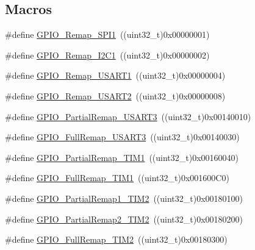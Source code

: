 \subsection*{Macros}
\begin{DoxyCompactItemize}
\item 
\#define \hyperlink{group___g_p_i_o___remap__define_ga58b02a04a6041954c6e99e681716ab4c}{G\+P\+I\+O\+\_\+\+Remap\+\_\+\+S\+P\+I1}~((uint32\+\_\+t)0x00000001)
\item 
\#define \hyperlink{group___g_p_i_o___remap__define_ga6cf601e6db62cb2e9dbbccb276401b18}{G\+P\+I\+O\+\_\+\+Remap\+\_\+\+I2\+C1}~((uint32\+\_\+t)0x00000002)
\item 
\#define \hyperlink{group___g_p_i_o___remap__define_ga804d946c5ca246a1f02f73a086586fd6}{G\+P\+I\+O\+\_\+\+Remap\+\_\+\+U\+S\+A\+R\+T1}~((uint32\+\_\+t)0x00000004)
\item 
\#define \hyperlink{group___g_p_i_o___remap__define_gaeb2ebb12e23138509af20dce1fc6c246}{G\+P\+I\+O\+\_\+\+Remap\+\_\+\+U\+S\+A\+R\+T2}~((uint32\+\_\+t)0x00000008)
\item 
\#define \hyperlink{group___g_p_i_o___remap__define_ga97af4aa8dded530353160cca615ad201}{G\+P\+I\+O\+\_\+\+Partial\+Remap\+\_\+\+U\+S\+A\+R\+T3}~((uint32\+\_\+t)0x00140010)
\item 
\#define \hyperlink{group___g_p_i_o___remap__define_gaa8831190b5b68e9f871955b791fa358b}{G\+P\+I\+O\+\_\+\+Full\+Remap\+\_\+\+U\+S\+A\+R\+T3}~((uint32\+\_\+t)0x00140030)
\item 
\#define \hyperlink{group___g_p_i_o___remap__define_ga0e94344776c53a76f6e9d933139c05a6}{G\+P\+I\+O\+\_\+\+Partial\+Remap\+\_\+\+T\+I\+M1}~((uint32\+\_\+t)0x00160040)
\item 
\#define \hyperlink{group___g_p_i_o___remap__define_gaf1f2d5cbc2281b3e3a6cc51c3fe7f77f}{G\+P\+I\+O\+\_\+\+Full\+Remap\+\_\+\+T\+I\+M1}~((uint32\+\_\+t)0x001600\+C0)
\item 
\#define \hyperlink{group___g_p_i_o___remap__define_ga7ad69d3e2643b2bfee4eebbea4a5b80e}{G\+P\+I\+O\+\_\+\+Partial\+Remap1\+\_\+\+T\+I\+M2}~((uint32\+\_\+t)0x00180100)
\item 
\#define \hyperlink{group___g_p_i_o___remap__define_ga42908e73dfc201d0a7b4ab0ed6f15eb7}{G\+P\+I\+O\+\_\+\+Partial\+Remap2\+\_\+\+T\+I\+M2}~((uint32\+\_\+t)0x00180200)
\item 
\#define \hyperlink{group___g_p_i_o___remap__define_ga2bd999e77236155935d2a598d4bac2a9}{G\+P\+I\+O\+\_\+\+Full\+Remap\+\_\+\+T\+I\+M2}~((uint32\+\_\+t)0x00180300)
\item 

\end{DoxyCompactItemize}
